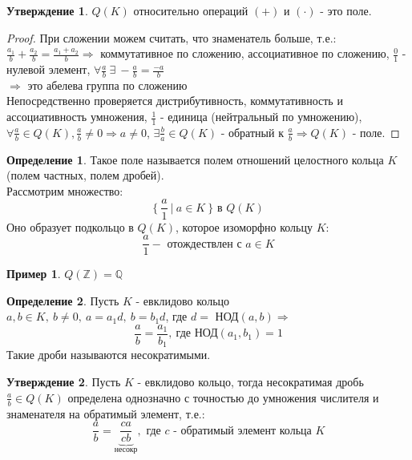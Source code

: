 \documentclass[a4paper, 12pt]{article}
\newcommand{\Q}{\mathbb Q}
\newcommand{\Z}{\mathbb Z}
\theoremstyle{definition}
\newtheorem*{definition}{Определение}
\newtheorem*{subtheorem}{Утверждение}
\newtheorem*{example1}{Пример}
\begin{document}
  \begin{subtheorem}
    $Q(K)$ относительно операций $(+)$ и $(\cdot)$ - это поле. 
  \end{subtheorem}
  \begin{proof}
    При сложении можем считать, что знаменатель больше, т.е.:\\ 
    $\frac{a_1}{b} + \frac{a_2}{b} = \frac{a_1+a_2}{b} \Longrightarrow $ коммутативное по сложению, ассоциативное по сложению, $\frac{0}{1}$ - нулевой элемент, $\forall \frac{a}{b} \  \exists \ -\frac{a}{b} = \frac{-a}{b}$\\
    $\Longrightarrow $ это абелева группа по сложению\\
    Непосредственно проверяется дистрибутивность, коммутативность и ассоциативность умножения, $\frac{1}{1}$ - единица (нейтральный по умножению),\\ $\forall \frac{a}{b} \in Q(K), \frac{a}{b} \neq 0 \Longrightarrow a \neq 0$, $\exists \frac{b}{a} \in Q(K)$ - обратный к $\frac{a}{b} \Longrightarrow Q(K)$ - поле.        
  \end{proof} 
  \begin{definition}
    Такое поле называется полем отношений целостного кольца $K$ (полем частных, полем дробей).\\ 
    Рассмотрим множество: 
    $$\{ \ \frac{a}{1} \ | \ a \in K\ \} \text{ в } Q(K)$$
    Оно образует подкольцо в $Q(K)$, которое изоморфно кольцу $K$:
    $$\frac{a}{1} - \text{ отождествлен с } a \in K$$
  \end{definition}
  \begin{example1}
    $Q(\Z) = \Q$
  \end{example1} 
  \begin{definition}
    Пусть $K$ - евклидово кольцо\\
    $a, b \in K, \ b\neq 0, \ a = a_1d, \ b = b_1d$, где $d = $ НОД$(a, b)\Longrightarrow $
    $$\frac{a}{b} = \frac{a_1}{b_1}, \  \text{где НОД}(a_1, b_1) = 1$$  
    Такие дроби называются несократимыми.
  \end{definition} 
  \begin{subtheorem}
    Пусть $K$ - евклидово кольцо, тогда несократимая дробь $\frac{a}{b} \in Q(K)$ определена однозначно с точностью до умножения числителя и знаменателя на обратимый элемент, т.е.:
    $$\frac{a}{b} = \underbrace{\frac{ca}{cb}}_{\text{несокр}} , \text{ где } c \text{ - обратимый элемент кольца } K$$ 
  \end{subtheorem}
\end{document}
